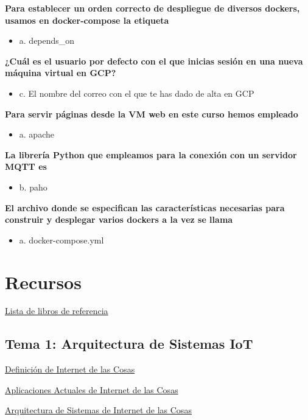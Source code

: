 \documentclass[12pt, twoside, openright]{report} %
\begin{document}
\textbf{Para establecer un orden correcto de despliegue de diversos dockers, usamos en docker-compose la etiqueta}
\begin{itemize}
	\item a. depends\_on
\end{itemize}

\textbf{¿Cuál es el usuario por defecto con el que inicias sesión en una nueva máquina virtual en GCP?}
\begin{itemize}
	\item c. El nombre del correo con el que te has dado de alta en GCP
\end{itemize}

\textbf{Para servir páginas desde la VM web en este curso hemos empleado}
\begin{itemize}
	\item a. apache
\end{itemize}

\textbf{La librería Python que empleamos para la conexión con un servidor MQTT es}
\begin{itemize}
	\item b. paho
\end{itemize}

\textbf{El archivo donde se especifican las características necesarias para construir y desplegar varios dockers a la vez se llama}
\begin{itemize}
	\item a. docker-compose.yml
\end{itemize}

\chapter{Recursos}
\href{https://learning.oreilly.com/playlists/5a6c045f-e39c-465e-9e7c-60dcbb12aebb}{Lista de libros de referencia}

\section{Tema 1: Arquitectura de Sistemas IoT}
\href{https://learning.oreilly.com/library/view/internet-of-things/9781788470599/a7f866bd-4ac8-47f3-a175-0f10d91a5ce2.xhtml}{Definición de Internet de las Cosas}

\href{https://learning.oreilly.com/library/view/internet-of-things/9781119456742/part04.xhtml\#part}{Aplicaciones Actuales de Internet de las Cosas}

\href{https://learning.oreilly.com/library/view/build-your-own/9781484244982/html/474034_1_En_2_Chapter.xhtml}{Arquitectura de Sistemas de Internet de las Cosas}
\end{document}

